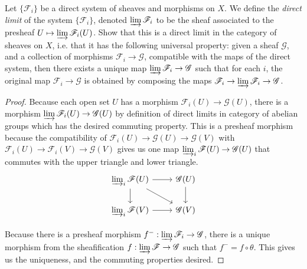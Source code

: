 \begin{exercise}%
	[Direct Limit.] Let $\{\mathscr{F}_i\}   $ be a direct system of sheaves and morphisms on $X $. We define the \textit{direct limit} of the system $\{\mathscr{F}_i\}   $, denoted $\varinjlim \mathscr{F}_i $ to be the sheaf associated to the presheaf $U\mapsto \varinjlim \mathscr{F}_i(U) $. Show that this is a direct limit in the category of sheaves on $X $, i.e. that it has the following universal property: given a sheaf $\mathscr{G} $, and a collection of morphisms $\mathscr{F}_i \to \mathscr{G} $, compatible with the maps of the direct system, then there exists a unique map $\varinjlim \mathscr{F}_i \to \mathscr{G} $ such that for each $i $, the original map $\mathscr{F}_i \to \mathscr{G} $ is obtained by composing the maps $\mathscr{F}_i \to \varinjlim \mathscr{F}_i \to \mathscr{G} $.
\end{exercise}
\begin{proof}
	Because each open set $U $ has a morphism $\mathscr{F}_i(U) \to \mathscr{G}(U) $, there is a morphism $\varinjlim \mathscr{F}_i(U) \to \mathscr{G}(U) $ by definition of direct limits in category of abelian groups which has the desired commuting property.
	This is a presheaf morphism because the compatibility of $\mathscr{F}_i(U) \to \mathscr{G}(U) \to \mathscr{G}(V) $ with $\mathscr{F}_i(U) \to \mathscr{F}_i(V) \to \mathscr{G}(V) $ gives us one map $\varinjlim_i \mathscr{F}(U) \to \mathscr{G}(U)$ that commutes with the upper triangle and lower triangle.
	\[
	\begin{tikzcd}
	\varinjlim_i \mathscr{F}(U) & \mathscr{G}(U)\\
	\varinjlim_i \mathscr{F}(V) & \mathscr{G}(V)
	\arrow[from=1-1,to=1-2]
	\arrow[from=1-1,to=2-1]
	\arrow[from=2-1,to=2-2]
	\arrow[from=1-2,to=2-2]
	\arrow[from=1-1,to=2-2]
	\end{tikzcd}
	\]

	Because there is a presheaf morphism $f^-: \varinjlim \mathscr{F}_i \to \mathscr{G}$, there is a unique morphism from the sheafification $f:\varinjlim \mathscr{F} \to \mathscr{G} $ such that $f^- = f \circ \theta $.
	This gives us the uniqueness, and the commuting properties desired.
\end{proof}

